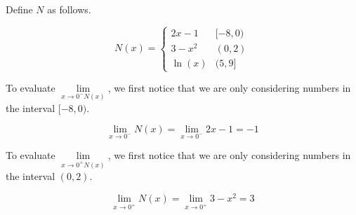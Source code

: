 \documentclass{ximera}
\begin{document}
\begin{example}

Define $N$ as follows.


\[
N(x) = 
\begin{cases}
  2x - 1   &    [-8, 0)     \\
  3 - x^2  &    (0, 2) \\
  \ln(x)    &    (5, 9]
\end{cases}
\]







\begin{explanation}


To evaluate $\lim\limits_{x \to 0^- N(x)}$, we first notice that we are only considering numbers in the interval $[-8, 0)$.


\[
\lim\limits_{x \to 0^-} N(x) = \lim\limits_{x \to 0^-} 2x - 1 = -1
\]



\end{explanation}









\begin{explanation}


To evaluate $\lim\limits_{x \to 0^+ N(x)}$, we first notice that we are only considering numbers in the interval $(0,2)$.


\[
\lim\limits_{x \to 0^+} N(x) = \lim\limits_{x \to 0^+} 3 - x^2 = 3
\]



\end{explanation}





\end{example}
\end{document}
